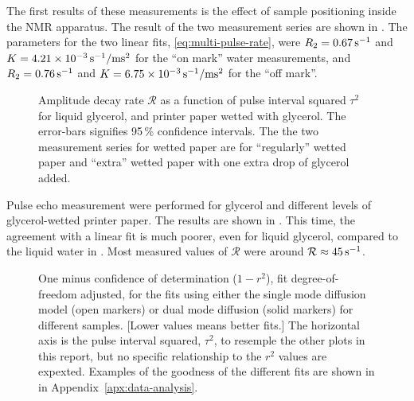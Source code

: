 \documentclass[11pt,a4paper, twocolumn,
swedish, english %
]{article}
\begin{document}
The first results of these measurements is the effect of sample
positioning inside the NMR apparatus. The result of the two
measurement series are shown in .
The parameters for the two linear fits, \eqref{eq:multi-pulse-rate},
were $R_2=\unit[0.67]{s^{-1}}$ and  
$K=\unit[4.21\times10^{-3}]{s^{-1}/ms^2}$ for the ``on mark'' water
measurements, and $R_2=\unit[0.76]{s^{-1}}$ and
$K=\unit[6.75\times10^{-3}]{s^{-1}/ms^2}$ for the ``off mark''.


\begin{figure}
\centering

\caption{Amplitude decay rate $\mathcal{R}$ as a function of pulse
  interval squared $\tau^2$ for liquid glycerol, and printer paper
  wetted with glycerol. The error-bars signifies 95\,\% confidence
  intervals. The the two measurement series for wetted paper are for
  ``regularly'' wetted paper and ``extra'' wetted paper with one extra
  drop of glycerol added. }
\label{fig:glyc}
\end{figure}

Pulse echo measurement were performed for glycerol and
different levels of glycerol-wetted printer paper. The results are
shown in . This time, the agreement with a linear fit
is much poorer, even for liquid glycerol, compared to the liquid water
in . Most measured values of $\mathcal{R}$ were
around $\mathcal{R}\approx\unit[45]{s^{-1}}$.


\begin{figure*}
\centering

\caption{One minus confidence of determination ($1-r^2$),
  fit degree-of-freedom adjusted, for the fits using either the single
  mode diffusion model (open markers) or dual mode diffusion (solid
  markers) for different samples. [Lower values means better fits.]
  The horizontal axis is the pulse interval squared, $\tau^2$, to
  resemple the other plots in this report, but no specific
  relationship to the $r^2$ values are expexted. Examples of the
  goodness of the different fits are shown in
   in Appendix~\ref{apx:data-analysis}. 
} 
\label{fig:good-fit}
\end{figure*}
\end{document}
